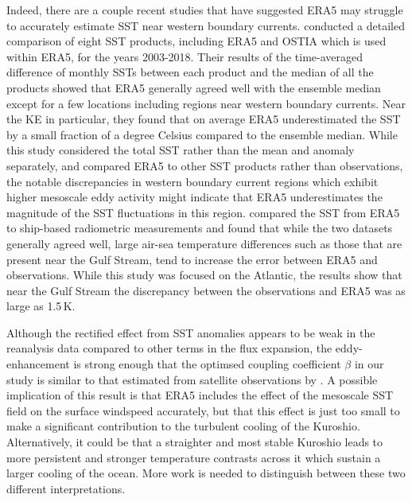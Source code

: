 Indeed, there are a couple recent studies that have suggested ERA5 may struggle to accurately estimate SST near western boundary currents. \citet{yang2021sea} conducted a detailed comparison of eight SST products, including ERA5 and OSTIA \citep{donlon2012operational} which is used within ERA5, for the years 2003-2018. Their results of the time-averaged difference of monthly SSTs between each product and the median of all the products showed that ERA5 generally agreed well with the ensemble median except for a few locations including regions near western boundary currents. Near the KE in particular, they found that on average ERA5 underestimated the SST by a small fraction of a degree Celsius compared to the ensemble median. While this study considered the total SST rather than the mean and anomaly separately, and compared ERA5 to other SST products rather than observations, the notable discrepancies in western boundary current regions which exhibit higher mesoscale eddy activity might indicate that ERA5 underestimates the magnitude of the SST fluctuations in this region. \citet{luo2020evaluation} compared the SST from ERA5 to ship-based radiometric measurements and found that while the two datasets generally agreed well, large air-sea temperature differences such as those that are present near the Gulf Stream, tend to increase the error between ERA5 and observations. While this study was focused on the Atlantic, the results show that near the Gulf Stream the discrepancy between the observations and ERA5 was as large as 1.5\,K.

Although the rectified effect from SST anomalies appears to be weak in the reanalysis data compared to other terms in the flux expansion, the eddy-enhancement is strong enough that the optimsed coupling coefficient $\beta$ in our study is similar to that estimated from satellite observations by \citet{ONeill2010}. A possible implication of this result is that ERA5 includes the effect of the mesoscale SST field on the surface windspeed accurately, but that this effect is just too small to make a significant contribution to the turbulent cooling of the Kuroshio. Alternatively, it could be that a straighter and most stable Kuroshio leads to more persistent and stronger temperature contrasts across it which sustain a larger cooling of the ocean. More work is needed to distinguish between these two different interpretations.




















